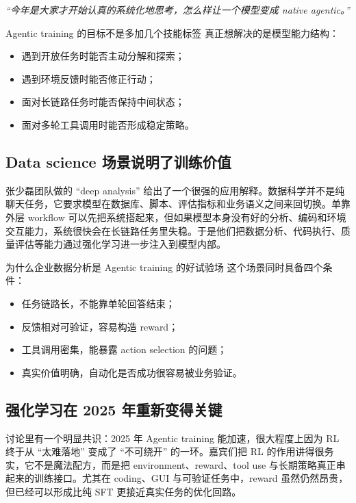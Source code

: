 \documentclass[a4paper]{article}
\begin{document}
\textit{``今年是大家才开始认真的系统化地思考，怎么样让一个模型变成 native agentic。''}

\begin{importantbox}{Agentic training 的目标不是多加几个技能标签}
真正想解决的是模型能力结构：
\begin{itemize}
  \item 遇到开放任务时能否主动分解和探索；
  \item 遇到环境反馈时能否修正行动；
  \item 面对长链路任务时能否保持中间状态；
  \item 面对多轮工具调用时能否形成稳定策略。
\end{itemize}
\end{importantbox}

\subsection{Data science 场景说明了训练价值}
张少磊团队做的 ``deep analysis'' 给出了一个很强的应用解释。数据科学并不是纯聊天任务，它要求模型在数据库、脚本、评估指标和业务语义之间来回切换。单靠外层 workflow 可以先把系统搭起来，但如果模型本身没有好的分析、编码和环境交互能力，系统很快会在长链路任务里失稳。于是他们把数据分析、代码执行、质量评估等能力通过强化学习进一步注入到模型内部。

\begin{knowledgebox}{为什么企业数据分析是 Agentic training 的好试验场}
这个场景同时具备四个条件：
\begin{itemize}
  \item 任务链路长，不能靠单轮回答结束；
  \item 反馈相对可验证，容易构造 reward；
  \item 工具调用密集，能暴露 action selection 的问题；
  \item 真实价值明确，自动化是否成功很容易被业务验证。
\end{itemize}
\end{knowledgebox}

\subsection{强化学习在 2025 年重新变得关键}
讨论里有一个明显共识：2025 年 Agentic training 能加速，很大程度上因为 RL 终于从 ``太难落地'' 变成了 ``不可绕开'' 的一环。嘉宾们把 RL 的作用讲得很务实，它不是魔法配方，而是把 environment、reward、tool use 与长期策略真正串起来的训练接口。尤其在 coding、GUI 与可验证任务中，reward 虽然仍然昂贵，但已经可以形成比纯 SFT 更接近真实任务的优化回路。
\end{document}
